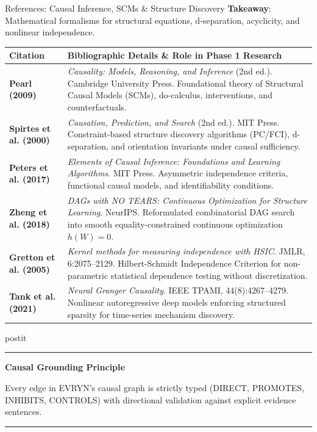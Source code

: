 \documentclass[aspectratio=43,10pt]{beamer}
\newcommand{\card}[4][\linewidth]{%
  \begin{beamercolorbox}[wd=#1,sep=0pt,rounded=false,shadow=false]{postit}%
    {\color{#3}\rule{\linewidth}{1.5pt}}\par
    \colorbox{slatebg}{%
      \begin{minipage}{\dimexpr#1-8pt\relax}%
        \vspace{1.5pt}%
        {\footnotesize\bfseries\color{#3}#2}\vspace{1.5pt}\par%
        {\scriptsize\color{darktext}#4}%
        \vspace{1.5pt}%
      \end{minipage}%
    }%
    \par{\color{bordergray}\rule{\linewidth}{0.6pt}}%
  \end{beamercolorbox}%
}
\begin{document}
\begin{frame}{References: Causal Inference, SCMs \& Structure Discovery}
  \vspace{-0.08cm}
  \textbf{Takeaway}: Mathematical formalisms for structural equations, d-separation, acyclicity, and nonlinear independence.
  \vspace{0.05cm}
  \begin{center}
    \fontsize{5.1pt}{6.3pt}\selectfont
    \begin{tabularx}{\linewidth}{p{2.2cm}>{\raggedright\arraybackslash}X}
      \toprule
      \textbf{\color{navy}Citation} & \textbf{\color{navy}Bibliographic Details \& Role in Phase 1 Research} \\
      \midrule
      \textbf{Pearl (2009)} & \textit{Causality: Models, Reasoning, and Inference} (2nd ed.). Cambridge University Press. Foundational theory of Structural Causal Models (SCMs), do-calculus, interventions, and counterfactuals. \\
      \addlinespace[1.5pt]
      \textbf{Spirtes et al. (2000)} & \textit{Causation, Prediction, and Search} (2nd ed.). MIT Press. Constraint-based structure discovery algorithms (PC/FCI), d-separation, and orientation invariants under causal sufficiency. \\
      \addlinespace[1.5pt]
      \textbf{Peters et al. (2017)} & \textit{Elements of Causal Inference: Foundations and Learning Algorithms}. MIT Press. Asymmetric independence criteria, functional causal models, and identifiability conditions. \\
      \addlinespace[1.5pt]
      \textbf{Zheng et al. (2018)} & \textit{DAGs with NO TEARS: Continuous Optimization for Structure Learning}. NeurIPS. Reformulated combinatorial DAG search into smooth equality-constrained continuous optimization $h(W)=0$. \\
      \addlinespace[1.5pt]
      \textbf{Gretton et al. (2005)} & \textit{Kernel methods for measuring independence with HSIC}. JMLR, 6:2075--2129. Hilbert-Schmidt Independence Criterion for non-parametric statistical dependence testing without discretization. \\
      \addlinespace[1.5pt]
      \textbf{Tank et al. (2021)} & \textit{Neural Granger Causality}. IEEE TPAMI, 44(8):4267--4279. Nonlinear autoregressive deep models enforcing structured sparsity for time-series mechanism discovery. \\
      \bottomrule
    \end{tabularx}
  \end{center}
  \vspace{0.04cm}
  \card{Causal Grounding Principle}{navy}{
    \fontsize{5.2pt}{6.4pt}\selectfont Every edge in EVRYN's causal graph is strictly typed (DIRECT, PROMOTES, INHIBITS, CONTROLS) with directional validation against explicit evidence sentences.
  }
\end{frame}
\end{document}
